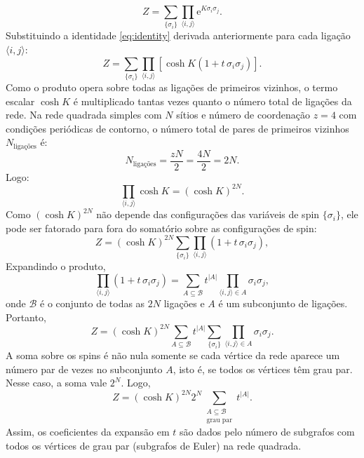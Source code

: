\documentclass[11pt,a4paper]{article}
\newcommand{\e}[1]{\mathrm{e}^{#1}}
\begin{document}
%
\begin{equation}
    Z = \sum_{\{\sigma_i\}} \prod_{\langle i,j\rangle} \e{K \sigma_i \sigma_j}.
\end{equation}
%
Substituindo a identidade \eqref{eq:identity} derivada anteriormente para cada ligação $\langle i,j \rangle$:
%
\begin{equation}
    Z = \sum_{\{\sigma_i\}} \prod_{\langle i,j\rangle} \left[ \cosh K \left(1 + t\, \sigma_i \sigma_j\right) \right].
\end{equation}
%
Como o produto opera sobre todas as ligações de primeiros vizinhos, o termo escalar $\cosh K$ é multiplicado tantas vezes quanto o número total de ligações da rede. Na rede quadrada simples com $N$ sítios e número de coordenação $z=4$ com condições periódicas de contorno, o número total de pares de primeiros vizinhos $N_{\text{ligações}}$ é:
%
\begin{equation}
    N_{\text{ligações}} = \frac{z N}{2} = \frac{4 N}{2} = 2N.
\end{equation}
%
Logo:
%
\begin{equation}
    \prod_{\langle i,j\rangle} \cosh K = (\cosh K)^{2N}.
\end{equation}
%
Como $(\cosh K)^{2N}$ não depende das configurações das variáveis de spin $\{\sigma_i\}$, ele pode ser fatorado para fora do somatório sobre as configurações de spin:
%
\begin{equation}
    Z = (\cosh K)^{2N} \sum_{\{\sigma_i\}} \prod_{\langle i,j\rangle} \left(1 + t\, \sigma_i \sigma_j\right),
    \label{eq:Z_prod}
\end{equation}
%
Expandindo o produto,
%
\begin{equation}
    \prod_{\langle i,j\rangle} \left(1 + t\, \sigma_i \sigma_j\right)
    = \sum_{A \subseteq \mathcal B} t^{|A|}
    \prod_{\langle i,j\rangle \in A} \sigma_i \sigma_j,
\end{equation}
%
onde $\mathcal B$ é o conjunto de todas as $2N$ ligações e $A$ é um subconjunto de ligações. Portanto,
%
\begin{equation}
    Z = (\cosh K)^{2N} \sum_{A \subseteq \mathcal B} t^{|A|}
    \sum_{\{\sigma_i\}} \prod_{\langle i,j\rangle \in A} \sigma_i \sigma_j.
    \label{eq:Z_sum_A}
\end{equation}
%
A soma sobre os spins é não nula somente se cada vértice da rede aparece um número par de vezes no subconjunto $A$, isto é, se todos os vértices têm grau par. Nesse caso, a soma vale $2^N$. Logo,
%
\begin{equation}
    Z = (\cosh K)^{2N} 2^N
    \sum_{\substack{A \subseteq \mathcal B \\ \text{grau par}}} t^{|A|}.
    \label{eq:Z_even}
\end{equation}
%
Assim, os coeficientes da expansão em $t$ são dados pelo número de subgrafos com todos os vértices de grau par (subgrafos de Euler) na rede quadrada.
\end{document}
